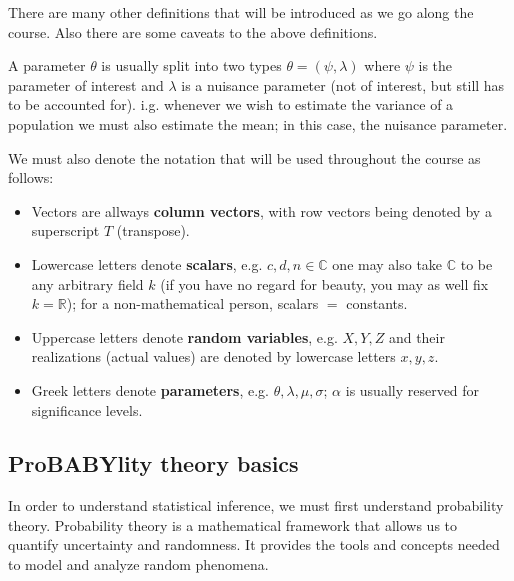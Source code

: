 There are many other definitions that will be introduced as we go along the course. Also there are some caveats to the above definitions.

\begin{remark}
   A parameter $\theta$ is usually split into two types $\theta = (\psi, \lambda)$ where $\psi$ is the parameter of interest and $\lambda$ is a nuisance parameter (not of interest, but still has to be accounted for).
   i.g. whenever we wish to estimate the variance of a population we must also estimate the mean; in this case, the nuisance parameter.
\end{remark}

We must also denote the notation that will be used throughout the course as follows:

\begin{itemize}
   \item Vectors are allways \textbf{column vectors}, with row vectors being denoted by a superscript $T$ (transpose).
   \item Lowercase letters denote \textbf{scalars}, e.g. $c, d, n \in \mathbb{C}$ one may also take $\mathbb{C}$ to be any arbitrary field $k$ (if you have no regard for beauty, you may as well fix $k=\mathbb{R}$); for a non-mathematical person, scalars $=$ constants.
   \item Uppercase letters denote \textbf{random variables}, e.g. $X, Y, Z$ and their realizations (actual values) are denoted by lowercase letters $x, y, z$. 
   \item Greek letters denote \textbf{parameters}, e.g. $\theta, \lambda, \mu, \sigma$; $\alpha$ is usually reserved for significance levels. 
\end{itemize}

\subsection{ProBABYlity theory basics}
In order to understand statistical inference, we must first understand probability theory. Probability theory is a mathematical framework that allows us to quantify uncertainty and randomness. It provides the tools and concepts needed to model and analyze random phenomena. 

\vspace{0.2cm}


